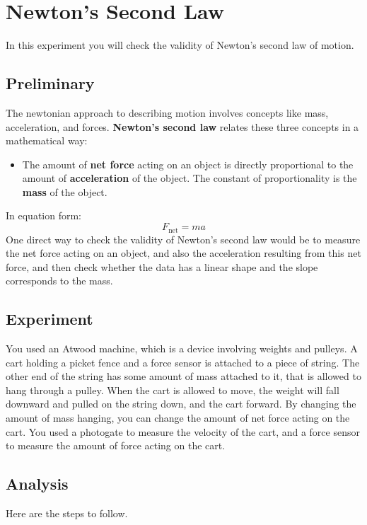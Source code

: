 \setcounter{chapter}{3}
\chapter{Newton's Second Law}
%
In this experiment you will check the validity of Newton's second law of motion.
%
\section{Preliminary}
%
The newtonian approach to describing motion involves concepts like mass, acceleration, and forces. \textbf{Newton's second law} relates these three concepts in a mathematical way:
\begin{itemize}
    \item The amount of \textbf{net force} acting on an object is directly proportional to the amount of \textbf{acceleration} of the object. The constant of proportionality is the \textbf{mass} of the object.
\end{itemize}
In equation form:
\begin{equation}
    F_{\text{net}} = m a
    \label{eq:04.Fma}
\end{equation}
One direct way to check the validity of Newton's second law would be to measure the net force acting on an object, and also the acceleration resulting from this net force, and then check whether the data has a linear shape and the slope corresponds to the mass.
%
\section{Experiment}
%
You used an Atwood machine, which is a device involving weights and pulleys. A cart holding a picket fence and a force sensor is attached to a piece of string. The other end of the string has some amount of mass attached to it, that is allowed to hang through a pulley. When the cart is allowed to move, the weight will fall downward and pulled on the string down, and the cart forward. By changing the amount of mass hanging, you can change the amount of net force acting on the cart. You used a photogate to measure the velocity of the cart, and a force sensor to measure the amount of force acting on the cart.
%
\section{Analysis}
%
Here are the steps to follow.
%
